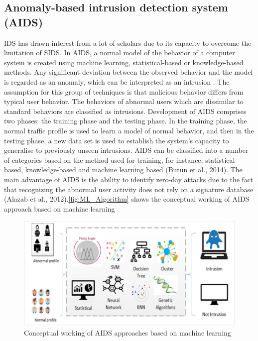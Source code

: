 \documentclass[conference]{IEEEtran}
\begin{document}
     \subsection{Anomaly-based intrusion detection system (AIDS)}
     IDS has drawn interest from a lot of scholars due to its capacity to overcome the limitation of SIDS. In AIDS, a normal model of the behavior of a computer system is created using machine learning, statistical-based or knowledge-based methods. Any significant deviation between the observed behavior and the model is regarded as an anomaly, which can be interpreted as an intrusion \cite{Khraisat2019}. The assumption for this group of techniques is that malicious behavior differs from typical user behavior. The behaviors of abnormal users which are dissimilar to standard behaviors are classified as intrusions. Development of AIDS comprises two phases: the training phase and the testing phase. In the training phase, the normal traffic profile is used to learn a model of normal behavior, and then in the testing phase, a new data set is used to establish the system’s capacity to generalise to previously unseen intrusions. AIDS can be classified into a number of categories based on the method used for training, for instance, statistical based, knowledge-based and machine learning based (Butun et al., 2014). The main advantage of AIDS is the ability to identify zero-day attacks due to the fact that recognizing the abnormal user activity does not rely on a signature database (Alazab et al., 2012).\ref{fig:ML_Algorithm} shows the conceptual working of AIDS approach based on machine learning \cite{Khraisat2019}
     
         \begin{figure}[htbp]
    \includegraphics[scale=0.35]{ML_Algorithm.png}
    \caption{Conceptual working of AIDS approaches based on machine learning}
    \label{fig1}
    \end{figure}
\end{document}
